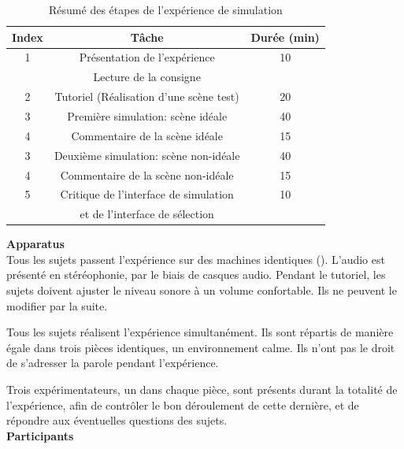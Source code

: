 \begin{table}[t]
\centering
\begin{tabular}{c c c} 
Index          & Tâche                               & Durée (min) \\                      
\hline
1 & Présentation de l'expérience                     & 10 \\
  & Lecture de la consigne                           &  \\
\hline
2 & Tutoriel (Réalisation d'une scène test)          & 20 \\
\hline
3 & Première simulation: scène idéale                & 40 \\
\hline
4  & Commentaire de la scène idéale                  & 15 \\
\hline
3 & Deuxième simulation: scène non-idéale            & 40  \\
\hline
4  & Commentaire de la scène non-idéale              & 15 \\
\hline
5 & Critique de l'interface de simulation            & 10 \\
  & et de l'interface de sélection                   & \\
\hline
\end{tabular}
\vspace{0.5mm}
\caption{Résumé des étapes de l’expérience de simulation}
\label{tab:indSimu}
\end{table}

\textbf{Apparatus} \\

Tous les sujets passent l'expérience sur des machines identiques (). L'audio est présenté en stéréophonie, par le biais de casques audio. Pendant le tutoriel, les sujets doivent ajuster le niveau sonore à un volume confortable. Ils ne peuvent le modifier par la suite.

Tous les sujets réalisent l'expérience simultanément. Ils sont répartis de manière égale dans trois pièces identiques,   un environnement calme. Ils n'ont pas le droit de s'adresser la parole pendant l'expérience.

Trois expérimentateurs, un dans chaque pièce, sont présents durant la totalité de l'expérience, afin de contrôler le bon déroulement de cette dernière, et de répondre aux éventuelles questions des sujets.  \\

\textbf{Participants} \\

